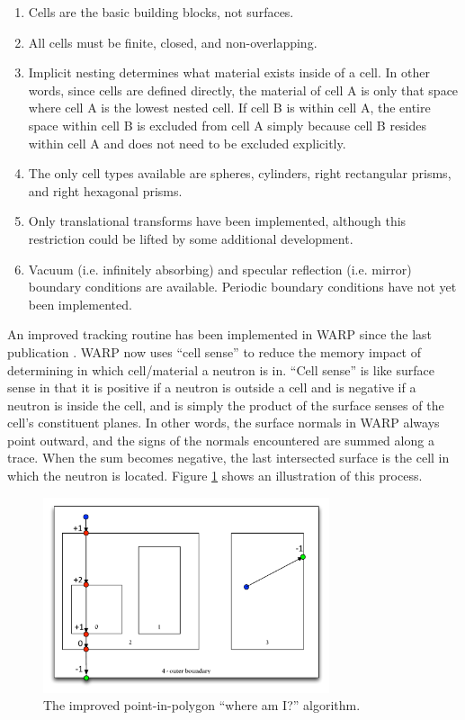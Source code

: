 \documentclass[preprint,12pt]{elsarticle}
\begin{document}
\begin{enumerate}
\item Cells are the basic building blocks, not surfaces.
\item All cells must be finite, closed, and non-overlapping.
\item Implicit nesting determines what material exists inside of a cell.  In other words, since cells are defined directly, the material of cell A is only that space where cell A is the lowest nested cell.  If cell B is within cell A, the entire space within cell B is excluded from cell A simply because cell B resides within cell A and does not need to be excluded explicitly.
\item The only cell types available are spheres, cylinders, right rectangular prisms, and right hexagonal prisms.
\item Only translational transforms have been implemented, although this restriction could be lifted by some additional development.
\item Vacuum (i.e. infinitely absorbing) and specular reflection  (i.e. mirror) boundary conditions are available.  Periodic boundary conditions have not yet been implemented.
\end{enumerate}

An improved tracking routine has been implemented in WARP since the last publication \cite{algorithms}.  WARP now uses ``cell sense'' to reduce the memory impact of determining in which cell/material a neutron is in.  ``Cell sense'' is like surface sense in that it is positive if a neutron is outside a cell and is negative if a neutron is inside the cell, and is simply the product of the surface senses of the cell's constituent planes.  In other words, the surface normals in WARP always point outward, and the signs of the normals encountered are summed along a trace.  When the sum becomes negative, the last intersected surface is the cell in which the neutron is located.  Figure \ref{whereami} shows an illustration of this process.

\begin{figure}[h!]
\centering
\includegraphics[width=0.75\textwidth]{graphics/whereami-new.pdf}
\caption{The improved point-in-polygon ``where am I?'' algorithm. \label{whereami} }
\end{figure}
\end{document}
